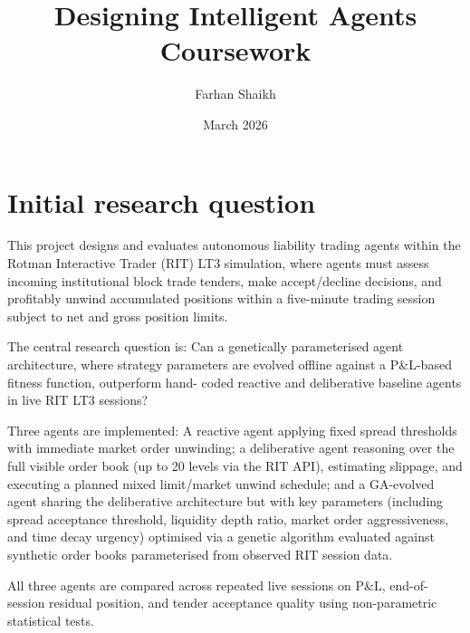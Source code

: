 \documentclass{article}
\title{Designing Intelligent Agents Coursework}
\author{Farhan Shaikh}
\date{March 2026}
\begin{document}
\maketitle
\section{Initial research question}

	
This project designs and evaluates autonomous liability trading agents within the Rotman Interactive Trader (RIT) LT3 simulation, where agents must assess incoming institutional block trade tenders, make accept/decline decisions, and profitably unwind accumulated positions within a five-minute trading session subject to net and gross position limits. \par

The central research question is: Can a genetically parameterised agent architecture, where strategy parameters are evolved offline against a P\&L-based fitness function, outperform hand- coded reactive and deliberative baseline agents in live RIT LT3 sessions? \par

Three agents are implemented: A reactive agent applying fixed spread thresholds with immediate market order unwinding; a deliberative agent reasoning over the full visible order book (up to 20 levels via the RIT API), estimating slippage, and executing a planned mixed limit/market unwind schedule; and a GA-evolved agent sharing the deliberative architecture but with key parameters (including spread acceptance threshold, liquidity depth ratio, market order aggressiveness, and time decay urgency) optimised via a genetic algorithm evaluated against synthetic order books parameterised from observed RIT session data. \par

All three agents are compared across repeated live sessions on P\&L, end-of-session residual position, and tender acceptance quality using non-parametric statistical tests.
\end{document}
